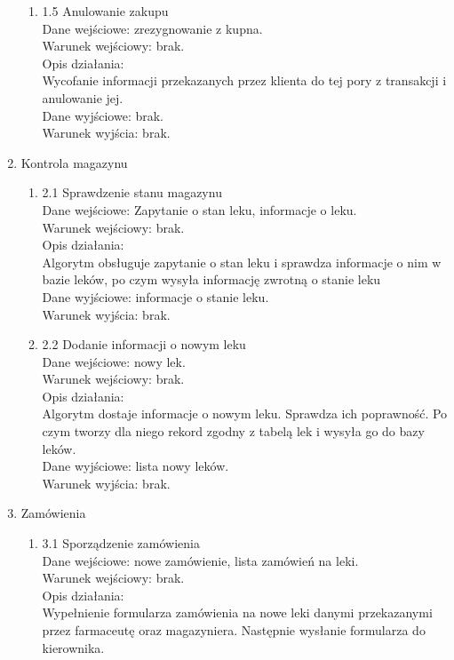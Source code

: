 \documentclass[a4paper, 11pt]{article}
\begin{document}
\begin{enumerate}
\begin{enumerate}
	
		
		
	\item 1.5 Anulowanie zakupu\\
	Dane wejściowe: zrezygnowanie z kupna.\\
	Warunek wejściowy: brak.\\
	Opis działania:\\
		Wycofanie informacji przekazanych przez klienta do tej pory z transakcji i anulowanie jej. \\
	Dane wyjściowe: brak.\\
	Warunek wyjścia: brak.\\	
	\end{enumerate}
	
	\item Kontrola magazynu
	\begin{enumerate}
	\item 2.1 Sprawdzenie stanu magazynu\\
	Dane wejściowe: Zapytanie o stan leku, informacje o leku.\\
	Warunek wejściowy: brak.\\
	Opis działania:\\
		Algorytm obsługuje zapytanie o stan leku i sprawdza informacje o nim w bazie leków, po czym wysyła informację zwrotną o stanie leku\\
	Dane wyjściowe: informacje o stanie leku.\\
	
	Warunek wyjścia: brak.\\
	\item 2.2 Dodanie informacji o nowym leku\\
	Dane wejściowe: nowy lek.\\
	Warunek wejściowy: brak.\\
	Opis działania:\\
		Algorytm dostaje informacje o nowym leku. Sprawdza ich poprawność. Po czym tworzy dla niego rekord zgodny z tabelą lek i wysyła go do bazy leków. \\
		
	Dane wyjściowe: lista nowy leków.\\
	Warunek wyjścia: brak.\\
\end{enumerate}		
	
	
	\item Zamówienia
	\begin{enumerate}
		\item 3.1 Sporządzenie zamówienia\\
	Dane wejściowe: nowe zamówienie, lista zamówień na leki.\\
	Warunek wejściowy: brak.\\
	Opis działania:\\
		Wypełnienie formularza zamówienia na nowe leki danymi przekazanymi przez farmaceutę oraz magazyniera. Następnie wysłanie formularza do kierownika.\\
		

\end{enumerate}
\end{enumerate}
\end{document}
